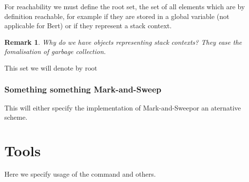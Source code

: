 \documentclass{article}
\newtheorem{remark}{Remark}
\newcommand{\mas}{Mark-and-Sweep}
\newcommand{\rootset}{\text{root}}
\newcommand{\code}[1]{\tcbox[on line, left=0mm,top=0.7mm,right=0mm,bottom=0.7mm]{\texttt{#1}}}
\begin{document}
	For reachability we must define the root set, the set of all elements which are by definition reachable, for example if they are stored in a global variable (not applicable for Bert) or if they represent a stack context.

	\begin{remark}
		Why do we have objects representing stack contexts? They ease the fomalisation of garbage collection.
	\end{remark}

	This set we will denote by $\rootset$

	\subsubsection{Something something \mas}

	This will either specify the implementation of \mas or an aternative scheme.

	\section{Tools}

	Here we specify usage of the \code{ernie} command and others.
\end{document}
